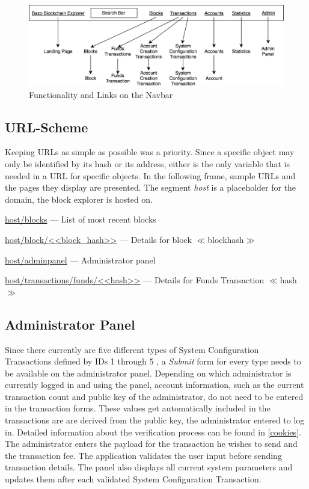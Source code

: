 \begin{figure}
  \includegraphics[scale=0.35]{navbarmockup.png}
  \centering
  \caption{Functionality and Links on the Navbar}
  \label{fig:navbar}
\end{figure}

\subsection{URL-Scheme}
Keeping URLs as simple as possible was a priority. Since a specific object may only be identified by its hash or its address, either is the only variable that is needed in a URL for specific objects. In the following frame, sample URLs and the pages they display are presented. The segment \emph{host} is a placeholder for the domain, the block explorer is hosted on.

\begin{framed}
\url{host/blocks} --- List of most recent blocks

\url{host/block/<<block_hash>>} --- Details for block $\ll$blockhash$\gg$

\url{host/adminpanel} --- Administrator panel

\url{host/transactions/funds/<<hash>>} --- Details for Funds Transaction $\ll$hash$\gg$



\end{framed}

\subsection{Administrator Panel}
Since there currently are five different types of System Configuration Transactions defined by IDs 1 through 5 \cite{bazo}, a \emph{Submit} form for every type needs to be available on the administrator panel. Depending on which administrator is currently logged in and using the panel, account information, such as the current transaction count and public key of the administrator, do not need to be entered in the transaction forms. These values get automatically included in the transactions are are derived from the public key, the administrator entered to log in. Detailed information about the verification process can be found in \ref{cookies}. The administrator enters the payload for the transaction he wishes to send and the transaction fee. The application validates the user input before sending transaction details. The panel also displays all current system parameters and updates them after each validated System Configuration Transaction. 

